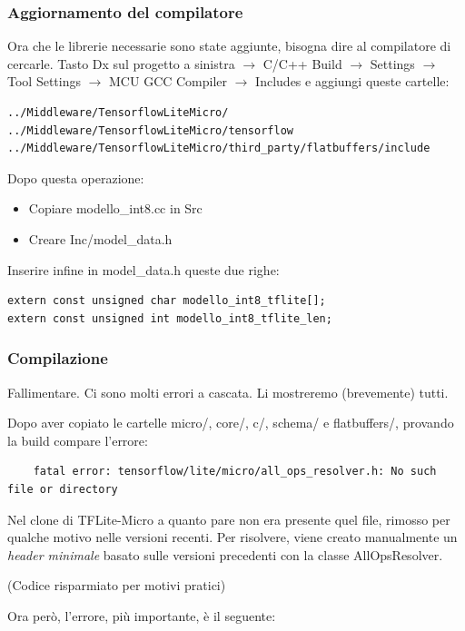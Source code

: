 \subsubsection{Aggiornamento del compilatore}
Ora che le librerie necessarie sono state aggiunte, bisogna dire al compilatore di cercarle. Tasto Dx sul progetto a sinistra $\rightarrow$ C/C++ Build $\rightarrow$ Settings $\rightarrow$ Tool Settings $\rightarrow$ MCU GCC Compiler $\rightarrow$ Includes e aggiungi queste cartelle:
\begin{verbatim}
../Middleware/TensorflowLiteMicro/
../Middleware/TensorflowLiteMicro/tensorflow
../Middleware/TensorflowLiteMicro/third_party/flatbuffers/include
\end{verbatim}
Dopo questa operazione:
\begin{itemize}
    \item Copiare modello\_int8.cc in Src
    \item Creare Inc/model\_data.h
\end{itemize}
Inserire infine in model\_data.h queste due righe:

\begin{verbatim}
extern const unsigned char modello_int8_tflite[]; 
extern const unsigned int modello_int8_tflite_len;
\end{verbatim}

\subsubsection{Compilazione}
Fallimentare. Ci sono molti errori a cascata. Li mostreremo (brevemente) tutti.

Dopo aver copiato le cartelle micro/, core/, c/, schema/ e flatbuffers/, provando la build compare l'errore:

\begin{verbatim}
    fatal error: tensorflow/lite/micro/all_ops_resolver.h: No such file or directory
\end{verbatim}

Nel clone di TFLite-Micro a quanto pare non era presente quel file, rimosso per qualche motivo nelle versioni recenti. Per risolvere, viene creato manualmente un \textit{header minimale} basato sulle versioni precedenti con la classe AllOpsResolver. 

\begin{center}
    (Codice risparmiato per motivi pratici)
\end{center}

Ora però, l'errore, più importante, è il seguente:

